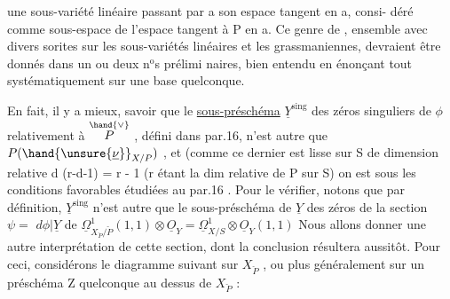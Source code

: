 
une sous-variété linéaire passant par a son espace tangent en a, consi-%
déré comme sous-espace  de l'espace tangent à P en a. Ce genre
\placedmargin{\hand{|}}de , ensemble avec divers sorites sur les sous-variétés linéaires
et les grassmaniennes, devraient être donnés dans un ou deux n$^{\text{o}}$s prélimi
naires, bien entendu en énonçant tout systématiquement sur une base
quelconque.

En fait, il y a mieux, savoir que le \uline{sous-préschéma} $\underline{Y}^{\mathrm{sing}}$
des zéros singuliers de $\phi$ relativement à $\overset{\hand{\vee}}{P}$ , défini dans par.16, n'est
autre que $P(\hand{\unsure{\underline{\nu}}}_{X/P})$ , et (comme ce dernier est lisse sur S de dimension
relative d \unsure{$+$} (r-d-1) = r - 1 (r étant la dim relative de P sur S)
on est sous les conditions favorables étudiées au par.16 .  Pour le vérifier,
notons que par définition, $\underline{Y}^{\mathrm{sing}}$ n'est autre que le sous-préschéma de $\underline{Y}$
des zéros de la section $\psi =$ $d\phi|\underline{Y}$ de $\underline{\Omega}^1_{X_{\check{P}}/\check{P}}(1,1)\otimes \underline{O}_Y = \underline{\Omega}^1_{X/S}\otimes\underline{O}_Y(1,1)$
Nous allons donner une autre interprétation de cette section, dont
la conclusion résultera aussitôt. Pour ceci, considérons le diagramme
suivant sur $X_{\check{P}}$ , ou plus généralement sur un préschéma Z quelconque au dessus de
$X_{\check{P}}$ :

